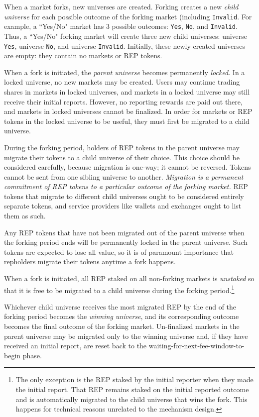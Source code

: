 \documentclass[floatfix,reprint,nofootinbib,amsmath,amssymb,epsfig,pre,floats,letterpaper,groupedaffiliation]{revtex4-1}
\theoremstyle{definition}
\theoremstyle{definition}
\begin{document}
When a market forks, new universes are created.  Forking creates a new \textit{child universe} for each possible outcome of the forking market (including \texttt{Invalid}.  For example, a ``Yes/No" market has 3 possible outcomes: \texttt{Yes}, \texttt{No}, and \texttt{Invalid}.  Thus, a ``Yes/No" forking market will create three new child universes: universe \texttt{Yes}, universe \texttt{No}, and universe \texttt{Invalid}.  Initially, these newly created universes are empty: they contain no markets or REP tokens.

When a fork is initiated, the \textit{parent universe} becomes permanently \textit{locked}.  In a locked universe, no new markets may be created.  Users may continue trading shares in markets in locked universes, and markets in a locked universe may still receive their initial reports. However, no reporting rewards are paid out there, and markets in locked universes cannot be finalized.  In order for markets or REP tokens in the locked universe to be useful, they must first be migrated to a child universe.

During the forking period, holders of REP tokens in the parent universe may migrate their tokens to a child universe of their choice.  This choice should be considered carefully, because migration is one-way; it cannot be reversed.  Tokens cannot be sent from one sibling universe to another.  \textit{Migration is a permanent commitment of REP tokens to a particular outcome of the forking market.}  REP tokens that migrate to different child universes ought to be considered entirely separate tokens, and service providers like wallets and exchanges ought to list them as such.

Any REP tokens that have not been migrated out of the parent universe when the forking period ends will be permanently locked in the parent universe. Such tokens are expected to lose all value, so it is of paramount importance that repholders migrate their tokens anytime a fork happens.

When a fork is initiated, all REP staked on all non-forking markets is \textit{unstaked} so that it is free to be migrated to a child universe during the forking period.\footnote{The only exception is the REP staked by the initial reporter when they made the initial report.  That REP remains staked on the initial reported outcome and is automatically migrated to the child universe that wins the fork. This happens for technical reasons unrelated to the mechanism design.}

Whichever child universe receives the most migrated REP by the end of the forking period becomes the \textit{winning universe}, and its corresponding outcome becomes the final outcome of the forking market.  Un-finalized markets in the parent universe may be migrated only to the winning universe and, if they have received an initial report, are reset back to the waiting-for-next-fee-window-to-begin phase.
\end{document}
